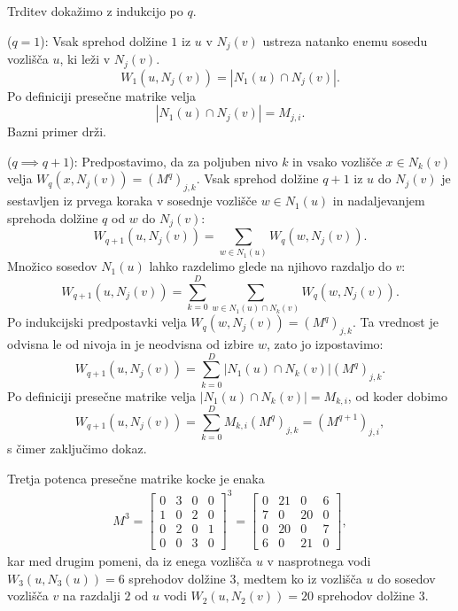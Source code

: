 \documentclass[fin1, tisk]{fmfdelo}
\begin{document}
\begin{dokaz}
    Trditev dokažimo z indukcijo po $q$.
    
    \smallskip
    \noindent($q = 1$): Vsak sprehod dolžine $1$ iz $u$ v $N_j(v)$ ustreza natanko 
    enemu sosedu vozlišča $u$, ki leži v $N_j(v)$.
    $$W_1(u, N_j(v)) = |N_1(u)\cap N_j(v)|.$$
    Po definiciji presečne matrike velja $$|N_1(u)\cap N_j(v)| = M_{j, i}.$$
    Bazni primer drži. 
    
    \smallskip
    \noindent($q\implies q+1$): Predpostavimo, da za poljuben nivo $k$ in vsako vozlišče $x\in N_k(v)$ velja
    $W_q(x, N_j(v)) = (M^q)_{j, k}$. Vsak sprehod dolžine $q+1$ iz $u$ do $N_j(v)$ 
     je sestavljen iz prvega koraka v sosednje vozlišče $w\in N_1(u)$ in nadaljevanjem sprehoda dolžine $q$ od $w$ do $N_j(v)$:
     $$W_{q+1}(u, N_j(v)) = \sum_{w\in N_1(u)} W_q(w, N_j(v)).$$
     Množico sosedov $N_1(u)$ lahko razdelimo glede na njihovo razdaljo do $v$:
     $$W_{q+1}(u, N_j(v)) = \sum_{k=0}^D \sum_{w\in N_1(u)\cap N_k(v)} W_q(w, N_j(v)).$$
     Po indukcijski predpostavki velja $W_q(w, N_j(v)) = (M^q)_{j, k}$. Ta vrednost je odvisna le od
     nivoja in je neodvisna od izbire $w$, zato jo izpostavimo:
     $$W_{q+1}(u, N_j(v)) = \sum_{k=0}^D |N_1(u)\cap N_k(v)|(M^q)_{j, k}.$$
     Po definiciji presečne matrike velja $|N_1(u)\cap N_k(v)| = M_{k, i}$, od koder dobimo
     $$W_{q+1}(u, N_j(v)) = \sum_{k=0}^D M_{k, i}(M^q)_{j,k} = (M^{q+1})_{j,i},$$
     s čimer zaključimo dokaz.
\end{dokaz}

\begin{zgled}
    Tretja potenca presečne matrike kocke je enaka
    \begin{align*}
        M^3 = \begin{bmatrix}
            0 & 3 & 0 & 0 \\
            1 & 0 & 2 & 0 \\
            0 & 2 & 0 & 1 \\
            0 & 0 & 3 & 0
        \end{bmatrix}^3 = 
        \begin{bmatrix}
            0 & 21 & 0 & 6 \\
            7 & 0 & 20 & 0 \\
            0 & 20 & 0 & 7 \\
            6 & 0 & 21 & 0
        \end{bmatrix},
    \end{align*}
    kar med drugim pomeni, da iz enega vozlišča $u$ v nasprotnega vodi $W_3(u, N_3(u)) = 6$ sprehodov dolžine $3$,
    medtem ko iz vozlišča $u$ do sosedov vozlišča $v$ na razdalji $2$ od $u$ vodi $W_2(u, N_2(v)) = 20$ sprehodov dolžine $3$.
\end{zgled}
\end{document}

